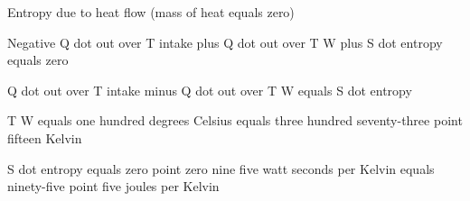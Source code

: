 Entropy due to heat flow (mass of heat equals zero)

Negative Q dot out over T intake plus Q dot out over T W plus S dot entropy equals zero

Q dot out over T intake minus Q dot out over T W equals S dot entropy

T W equals one hundred degrees Celsius equals three hundred seventy-three point fifteen Kelvin

S dot entropy equals zero point zero nine five watt seconds per Kelvin equals ninety-five point five joules per Kelvin